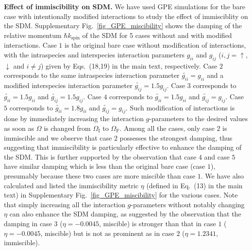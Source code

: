 \documentclass[showpacs,preprintnumbers,amsmath,amssymb, superscriptaddress, aps, reprint]{revtex4-1}
\def\OmegaF{\Omega_{\text{F}}}
\def\OmegaI{\Omega_{\text{I}}}
\begin{document}
{{\vspace{5mm}
\noindent
\textbf{Effect of immiscibility on SDM.} We have used GPE simulations for the bare case with intentionally modified interactions to study the effect of immisciblity on the SDM. Supplementary Fig.~\ref{fig_GPE_miscibility} shows the damping of the relative momentum $\hbar k_{\text{spin}}$ of the SDM for 5 cases without and with modified interactions. Case $1$ is the original bare case without modification of interactions, with the intraspecies and interspecies interaction parameters $g_{ii}$ and $g_{ij}$ ($i,j = \uparrow$, $\downarrow$ and $i\neq j$) given by {Eqs.~(18,19) in the main text}, respectively. Case $2$ corresponds to the same intraspecies interaction parameter $\tilde{g_{ii}}=g_{ii}$ and a modified interspecies interaction parameter $\tilde{g_{ij}}=1.5g_{ij}$. Case $3$ corresponds to $\tilde{g_{ii}}=1.5g_{ii}$ and $\tilde{g_{ij}}=1.5g_{ij}$. Case $4$ corresponds to $\tilde{g_{ii}}=1.5g_{ii}$ and $\tilde{g_{ij}}=g_{ij}$. Case $5$ corresponds to $\tilde{g_{ii}}=1.8g_{ii}$ and $\tilde{g_{ij}}=g_{ij}$. Such modification of interactions is done by immediately increasing the interaction $g$-parameters to the desired values as soon as $\Omega$ is changed from $\OmegaI$ to $\OmegaF$. Among all the cases, only case $2$ is immiscible and we observe that case $2$ possesses the strongest damping, thus suggesting that immiscibility is particularly effective to enhance the damping of the SDM. This is further supported by the observation that case $4$ and case $5$ have similar damping which is less than the original bare case (case $1$), presumably because these two cases are more miscible than case $1$. We have also calculated and listed the immiscibility metric $\eta$ (defined in {Eq.~(13) in the main text}) in Supplementary Fig.~\ref{fig_GPE_miscibility} for the various cases. Note that simply increasing all the interaction $g$-parameters without notably changing $\eta$ can also enhance the SDM damping, as suggested by the observation that the damping in case $3$ ($\eta=-0.0045$, miscible) is stronger than that in case $1$ ($\eta=-0.0045$, miscible) but is not as prominent as in case $2$ ($\eta=1.2341$, immiscible).

}}
\end{document}
